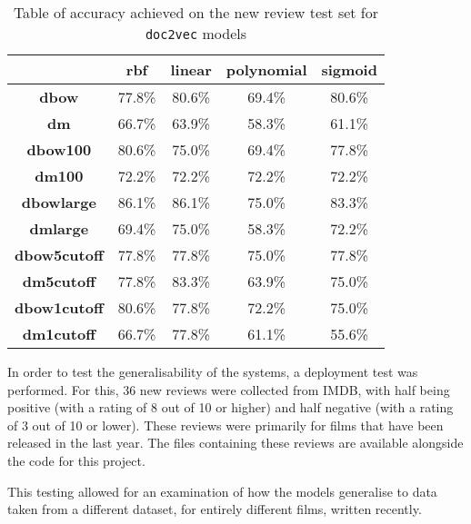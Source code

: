 \documentclass[twocolumn]{article}
\begin{document}
\begin{table*}[]
\centering
\captionsetup{justification=centering}
\caption{Table of accuracy achieved on the new review test set for \texttt{doc2vec} models}
\label{table:newrevd2v}
\begin{tabular}{|c|c|c|c|c|}
\hline
                     & \textbf{rbf} & \textbf{linear} & \textbf{polynomial} & \textbf{sigmoid} \\ \hline
\textbf{dbow}        & 77.8\%       & 80.6\%          & 69.4\%              & 80.6\%           \\ \hline
\textbf{dm}          & 66.7\%       & 63.9\%          & 58.3\%              & 61.1\%           \\ \hline
\textbf{dbow100}     & 80.6\%       & 75.0\%          & 69.4\%              & 77.8\%           \\ \hline
\textbf{dm100}       & 72.2\%       & 72.2\%          & 72.2\%              & 72.2\%           \\ \hline
\textbf{dbowlarge}   & 86.1\%       & 86.1\%          & 75.0\%              & 83.3\%           \\ \hline
\textbf{dmlarge}     & 69.4\%       & 75.0\%          & 58.3\%              & 72.2\%           \\ \hline
\textbf{dbow5cutoff} & 77.8\%       & 77.8\%          & 75.0\%              & 77.8\%           \\ \hline
\textbf{dm5cutoff}   & 77.8\%       & 83.3\%          & 63.9\%              & 75.0\%           \\ \hline
\textbf{dbow1cutoff} & 80.6\%       & 77.8\%          & 72.2\%              & 75.0\%           \\ \hline
\textbf{dm1cutoff}   & 66.7\%       & 77.8\%          & 61.1\%              & 55.6\%           \\ \hline
\end{tabular}
\end{table*}

In order to test the generalisability of the systems, a deployment test was performed. For this, 36 new reviews were collected from IMDB, with half being positive (with a rating of 8 out of 10 or higher) and half negative (with a rating of 3 out of 10 or lower). These reviews were primarily for films that have been released in the last year. The files containing these reviews are available alongside the code for this project.

This testing allowed for an examination of how the models generalise to data taken from a different dataset, for entirely different films, written recently.
\end{document}
